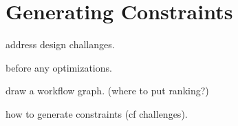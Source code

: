 \section{Generating Constraints}
\label{s:gen}

address design challanges.

before any optimizations.

draw a workflow graph. (where to put ranking?)

how to generate constraints (cf challenges).
